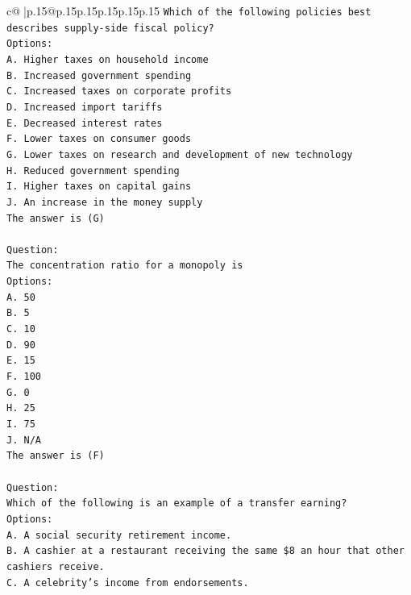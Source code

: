\documentclass{article}
\begin{document}
{\begin{supertabular}{c@{$\;$}|p{.15\linewidth}@{}p{.15\linewidth}p{.15\linewidth}p{.15\linewidth}p{.15\linewidth}p{.15\linewidth}}
{{{\texttt{Which of the following policies best describes supply{-}side fiscal policy?} \\
\texttt{Options:} \\
\texttt{A. Higher taxes on household income} \\
\texttt{B. Increased government spending} \\
\texttt{C. Increased taxes on corporate profits} \\
\texttt{D. Increased import tariffs} \\
\texttt{E. Decreased interest rates} \\
\texttt{F. Lower taxes on consumer goods} \\
\texttt{G. Lower taxes on research and development of new technology} \\
\texttt{H. Reduced government spending} \\
\texttt{I. Higher taxes on capital gains} \\
\texttt{J. An increase in the money supply} \\
\texttt{The answer is (G)} \\
\\ 
\texttt{Question:} \\
\texttt{The concentration ratio for a monopoly is} \\
\texttt{Options:} \\
\texttt{A. 50} \\
\texttt{B. 5} \\
\texttt{C. 10} \\
\texttt{D. 90} \\
\texttt{E. 15} \\
\texttt{F. 100} \\
\texttt{G. 0} \\
\texttt{H. 25} \\
\texttt{I. 75} \\
\texttt{J. N/A} \\
\texttt{The answer is (F)} \\
\\ 
\texttt{Question:} \\
\texttt{Which of the following is an example of a transfer earning?} \\
\texttt{Options:} \\
\texttt{A. A social security retirement income.} \\
\texttt{B. A cashier at a restaurant receiving the same \$8 an hour that other cashiers receive.} \\
\texttt{C. A celebrity's income from endorsements.} \\
}}}
\end{supertabular}}
\end{document}
